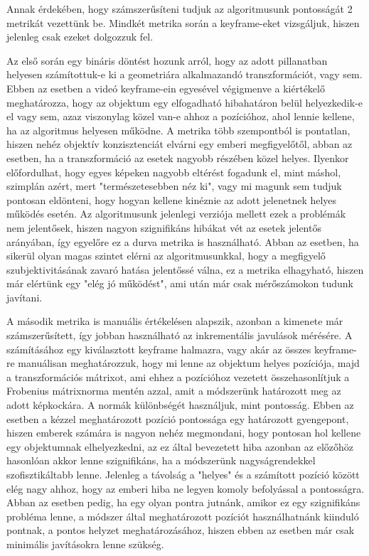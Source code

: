Annak érdekében, hogy számszerűsíteni tudjuk az algoritmusunk pontosságát 2 metrikát vezettünk be.
Mindkét metrika során a keyframe-eket vizsgáljuk, hiszen jelenleg csak ezeket dolgozzuk fel.

Az első során egy bináris döntést hozunk arról, hogy az adott pillanatban helyesen számítottuk-e ki a geometriára alkalmazandó transzformációt, vagy sem.
Ebben az esetben a videó keyframe-ein egyesével végigmenve a kiértékelő meghatározza, hogy az objektum egy elfogadható hibahatáron belül helyezkedik-e el vagy sem, azaz viszonylag közel van-e ahhoz a pozícióhoz, ahol lennie kellene, ha az algoritmus helyesen működne.
A metrika több szempontból is pontatlan, hiszen nehéz objektív konzisztenciát elvárni egy emberi megfigyelőtől, abban az esetben, ha a transzformáció az esetek nagyobb részében közel helyes.
Ilyenkor előfordulhat, hogy egyes képeken nagyobb eltérést fogadunk el, mint máshol, szimplán azért, mert "természetesebben néz ki", vagy mi magunk sem tudjuk pontosan eldönteni, hogy hogyan kellene kinéznie az adott jelenetnek helyes működés esetén.
Az algoritmusunk jelenlegi verziója mellett ezek a problémák nem jelentősek, hiszen nagyon szignifikáns hibákat vét az esetek jelentős arányában, így egyelőre ez a durva metrika is használható.
Abban az esetben, ha sikerül olyan magas szintet elérni az algoritmusunkkal, hogy a megfigyelő szubjektivitásának zavaró hatása jelentőssé válna, ez a metrika elhagyható, hiszen már elértünk egy "elég jó működést", ami után már csak mérőszámokon tudunk javítani.

A második metrika is manuális értékelésen alapszik, azonban a kimenete már számszerűsített, így jobban használható az inkrementális javulások mérésére.
A számításához egy kiválasztott keyframe halmazra, vagy akár az összes keyframe-re manuálisan meghatározzuk, hogy mi lenne az objektum helyes pozíciója, majd a transzformációs mátrixot, ami ehhez a pozícióhoz vezetett összehasonlítjuk a Frobenius mátrixnorma mentén azzal, amit a módszerünk határozott meg az adott képkockára.
A normák különbségét használjuk, mint pontosság.
Ebben az esetben a kézzel meghatározott pozíció pontossága egy határozott gyengepont, hiszen emberek számára is nagyon nehéz megmondani, hogy pontosan hol kellene egy objektumnak elhelyezkedni, az ez által bevezetett hiba azonban az előzőhöz hasonlóan akkor lenne szignifikáns, ha a módszerünk nagyságrendekkel szofisztikáltabb lenne.
Jelenleg a távolság a "helyes" és a számított pozíció között elég nagy ahhoz, hogy az emberi hiba ne legyen komoly befolyással a pontosságra.
Abban az esetben pedig, ha egy olyan pontra jutnánk, amikor ez egy szignifikáns probléma lenne, a módszer által meghatározott pozíciót használhatnánk kiinduló pontnak, a pontos helyzet meghatározásához, hiszen ebben az esetben már csak minimális javításokra lenne szükség.

